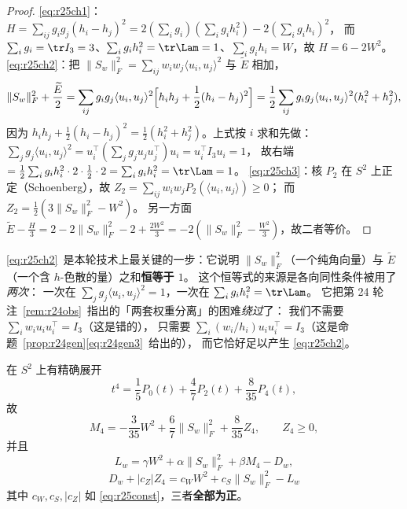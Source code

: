 \begin{proof}
\eqref{eq:r25ch1}：$H=\sum_{ij}g_ig_j(h_i-h_j)^2=2(\sum_ig_i)(\sum_ig_ih_i^2)-2(\sum_ig_ih_i)^2$，
而 $\sum_ig_i=\tr I_3=3$、$\sum_ig_ih_i^2=\tr\Lam=1$、$\sum_ig_ih_i=W$，故 $H=6-2W^2$。
\eqref{eq:r25ch2}：把 $\|S_w\|_F^2=\sum_{ij}w_iw_j\langle u_i,u_j\rangle^2$ 与 $\widetilde E$ 相加，
\[
\|S_w\|_F^2+\frac{\widetilde E}2
=\sum_{ij}g_ig_j\langle u_i,u_j\rangle^2\Bigl[h_ih_j+\frac12(h_i-h_j)^2\Bigr]
=\frac12\sum_{ij}g_ig_j\langle u_i,u_j\rangle^2(h_i^2+h_j^2),
\]
因为 $h_ih_j+\frac12(h_i-h_j)^2=\frac12(h_i^2+h_j^2)$。上式按 $i$ 求和先做：
$\sum_jg_j\langle u_i,u_j\rangle^2=u_i^\top(\sum_jg_ju_ju_j^\top)u_i=u_i^\top I_3u_i=1$，
故右端 $=\frac12\sum_ig_ih_i^2\cdot2\cdot\frac12\cdot2=\sum_ig_ih_i^2=\tr\Lam=1$。
\eqref{eq:r25ch3}：核 $P_2$ 在 $S^2$ 上正定（Schoenberg），故
$Z_2=\sum_{ij}w_iw_jP_2(\langle u_i,u_j\rangle)\ge0$；
而 $Z_2=\frac12(3\|S_w\|_F^2-W^2)$。
另一方面 $\widetilde E-\frac H3=2-2\|S_w\|_F^2-2+\frac{2W^2}3=-2(\|S_w\|_F^2-\frac{W^2}3)$，故二者等价。
\end{proof}

\begin{remark}
\eqref{eq:r25ch2}~是本轮技术上最关键的一步：它说明
$\|S_w\|_F^2$（一个纯角向量）与 $\widetilde E$（一个含 $h$-色散的量）之和\textbf{恒等于 $1$}。
这个恒等式的来源是各向同性条件被用了\emph{两次}：
一次在 $\sum_jg_j\langle u_i,u_j\rangle^2=1$，一次在 $\sum_ig_ih_i^2=\tr\Lam$。
它把第 24 轮注~\ref{rem:r24obs}~指出的「两套权重分离」的困难\emph{绕过}了：
我们不需要 $\sum_iw_iu_iu_i^\top=I_3$（这是错的），
只需要 $\sum_i(w_i/h_i)u_iu_i^\top=I_3$（这是命题~\ref{prop:r24gen}\eqref{eq:r24gen3}~给出的），
而它恰好足以产生 \eqref{eq:r25ch2}。
\end{remark}

\begin{lemma}\label{lem:r25scho}
在 $S^2$ 上有精确展开
\begin{equation}\label{eq:r25scho1}
t^4=\frac15P_0(t)+\frac47P_2(t)+\frac8{35}P_4(t),
\end{equation}
故
\begin{equation}\label{eq:r25scho2}
M_4=-\frac3{35}W^2+\frac67\|S_w\|_F^2+\frac8{35}Z_4,\qquad Z_4\ge0 ,
\end{equation}
并且
\begin{equation}\label{eq:r25scho3}
L_w=\gamma W^2+\alpha\|S_w\|_F^2+\beta M_4-D_w ,
\end{equation}
\begin{equation}\label{eq:r25key}
\boxed{\;D_w+|c_Z|Z_4=c_WW^2+c_S\|S_w\|_F^2-L_w\;}
\end{equation}
其中 $c_W,c_S,|c_Z|$ 如 \eqref{eq:r25const}，三者\textbf{全部为正}。
\end{lemma}

